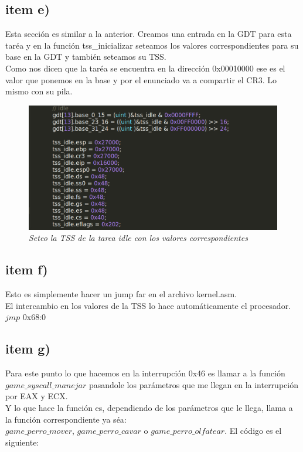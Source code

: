\subsection{item e)}
Esta sección es similar a la anterior. Creamos una entrada en la GDT para esta taréa y en la función tss\_inicializar seteamos los valores correspondientes para su base en la GDT y también seteamos su TSS.\\
Como nos dicen que la taréa se encuentra en la dirección 0x00010000 ese es el valor que ponemos en la base y por el enunciado va a compartir el CR3. Lo mismo con su pila.\\
\begin{figure}[H]
\begin{center}
\includegraphics[width=\linewidth]{ejercicio6/tss_idle.png}
\caption{{\small \textit{Seteo la TSS de la tarea idle con los valores correspondientes}}}
\endminipage
\end{center}
\end{figure}

\subsection{item f)}
Esto es simplemente hacer un jump far en el archivo kernel.asm.\\
El intercambio en los valores de la TSS lo hace automáticamente el procesador.\\
 $jmp$ 0x68:0

 \subsection{item g)}
Para este punto lo que hacemos en la interrupción 0x46 es llamar a la función $game\_syscall\_manejar$ pasandole los parámetros que me llegan en la interrupción por EAX y ECX.\\
Y lo que hace la función es, dependiendo de los parámetros que le llega, llama a la función correspondiente ya séa:\\
$game\_perro\_mover$, $game\_perro\_cavar$ o $game\_perro\_olfatear$. El código es el siguiente:\\

